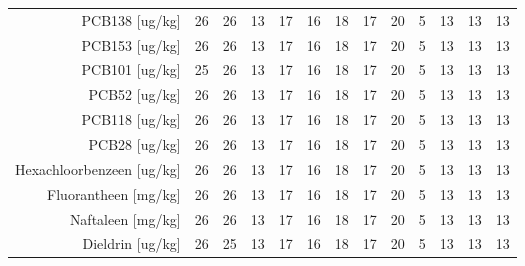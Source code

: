 \begin{tabular}{ r |c | c | c | c | c |c | c | c | c | c | c | c }
PCB138 [ug/kg] &26 & 26 & 13 & 17 & 16 & 18 & 17 & 20 & 5 & 13 & 13 & 13 \\
PCB153 [ug/kg] &26 & 26 & 13 & 17 & 16 & 18 & 17 & 20 & 5 & 13 & 13 & 13 \\
PCB101 [ug/kg] &25 & 26 & 13 & 17 & 16 & 18 & 17 & 20 & 5 & 13 & 13 & 13 \\
PCB52 [ug/kg] &26 & 26 & 13 & 17 & 16 & 18 & 17 & 20 & 5 & 13 & 13 & 13 \\
PCB118 [ug/kg] &26 & 26 & 13 & 17 & 16 & 18 & 17 & 20 & 5 & 13 & 13 & 13 \\
PCB28 [ug/kg] &26 & 26 & 13 & 17 & 16 & 18 & 17 & 20 & 5 & 13 & 13 & 13 \\
Hexachloorbenzeen [ug/kg] &26 & 26 & 13 & 17 & 16 & 18 & 17 & 20 & 5 & 13 & 13 & 13 \\
Fluorantheen [mg/kg] &26 & 26 & 13 & 17 & 16 & 18 & 17 & 20 & 5 & 13 & 13 & 13 \\
Naftaleen [mg/kg] &26 & 26 & 13 & 17 & 16 & 18 & 17 & 20 & 5 & 13 & 13 & 13 \\
Dieldrin [ug/kg] &26 & 25 & 13 & 17 & 16 & 18 & 17 & 20 & 5 & 13 & 13 & 13 \\
\end{tabular}    
